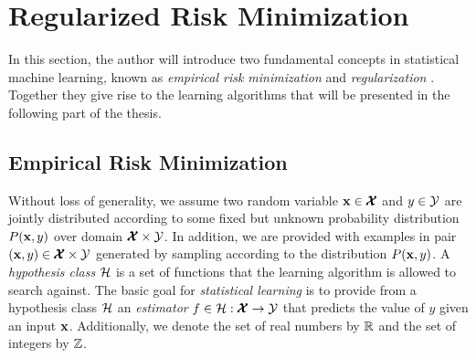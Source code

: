 %
\section{Regularized Risk Minimization}\label{sc_rrm}

In this section, the author will introduce two fundamental concepts in statistical machine learning, known as \textit{empirical risk minimization} \citep{Vapnik92principles} and \textit{regularization} \citep{Evgeniou99a} .
Together they give rise to the learning algorithms that will be presented in the following part of the thesis.

\subsection{Empirical Risk Minimization}\label{sc_erm}

Without loss of generality, we assume two random variable $\mathbf {x}\in\pmb {\mathcal{X}}$ and $y\in\mathcal{Y}$ are jointly distributed according to some fixed but unknown probability distribution $P(\mathbf {x},y)$ over domain $\pmb {\mathcal{X}}\times\mathcal{Y}$.
In addition, we are provided with examples in pair $(\mathbf {x},y)\in\pmb {\mathcal{X}}\times\mathcal{Y}$ generated by sampling according to the distribution $P(\mathbf {x},y)$.
A \textit{hypothesis class} $\mathcal{H}$ is a set of functions that the learning algorithm is allowed to search against.
The basic goal for \textit{statistical learning} is to provide from a hypothesis class $\mathcal{H}$ an \textit{estimator} $f\in\mathcal{H}:\pmb {\mathcal{X}}\rightarrow\mathcal{Y}$ that predicts the value of $y$ given an input $\mathbf {x}$.
Additionally, we denote the set of real numbers by $\mathbb{R}$ and the set of integers by $\mathbb{Z}$.

